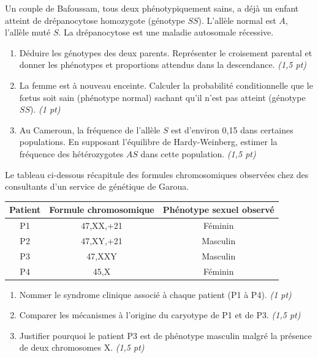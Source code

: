 \documentclass[11pt]{article}
\begin{document}
\begin{exercice}
\label{exo:drepano}
Un couple de Bafoussam, tous deux phénotypiquement sains, a déjà un enfant atteint de drépanocytose homozygote (génotype $SS$). L'allèle normal est $A$, l'allèle muté $S$. La drépanocytose est une maladie autosomale récessive.
\begin{enumerate}
    \item Déduire les génotypes des deux parents. Représenter le croisement parental et donner les phénotypes et proportions attendus dans la descendance. \textit{(1,5 pt)}
    \item La femme est à nouveau enceinte. Calculer la probabilité conditionnelle que le fœtus soit sain (phénotype normal) sachant qu'il n'est pas atteint (génotype $SS$). \textit{(1 pt)}
    \item Au Cameroun, la fréquence de l'allèle $S$ est d'environ 0,15 dans certaines populations. En supposant l'équilibre de Hardy-Weinberg, estimer la fréquence des hétérozygotes $AS$ dans cette population. \textit{(1,5 pt)}
\end{enumerate}
\end{exercice}

\begin{exercice}
\label{exo:anomalies_nombre}
Le tableau ci-dessous récapitule des formules chromosomiques observées chez des consultants d'un service de génétique de Garoua.
\begin{center}
\begin{tabular}{|c|c|c|}
\hline
\textbf{Patient} & \textbf{Formule chromosomique} & \textbf{Phénotype sexuel observé} \\
\hline
P1 & 47,XX,+21 & Féminin \\
P2 & 47,XY,+21 & Masculin \\
P3 & 47,XXY & Masculin \\
P4 & 45,X & Féminin \\
\hline
\end{tabular}
\end{center}
\begin{enumerate}
    \item Nommer le syndrome clinique associé à chaque patient (P1 à P4). \textit{(1 pt)}
    \item Comparer les mécanismes à l'origine du caryotype de P1 et de P3. \textit{(1,5 pt)}
    \item Justifier pourquoi le patient P3 est de phénotype masculin malgré la présence de deux chromosomes X. \textit{(1,5 pt)}
\end{enumerate}
\end{exercice}
\end{document}
